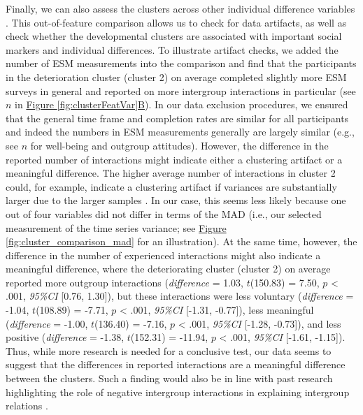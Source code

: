 \documentclass[man, 12pt, a4paper, floatsintext]{apa7}
\theoremstyle{break}
\theoremstyle{plain}
\newcommand{\fgrref}[2][]{\hyperref[#2]{Figure \ref*{#2}#1}}
\begin{document}
Finally, we can also assess the clusters across other individual
difference variables \citep[e.g.,][]{monden2022}. This out-of-feature
comparison allows us to check for data artifacts, as well as check
whether the developmental clusters are associated with important social
markers and individual differences. To illustrate artifact checks, we
added the number of ESM measurements into the comparison and find that
the participants in the deterioration cluster (cluster 2) on average
completed slightly more ESM surveys in general and reported on more
intergroup interactions in particular (see \(n\) in
\fgrref[B]{fig:clusterFeatVar}). In our data exclusion procedures, we
ensured that the general time frame and completion rates are similar for
all participants and indeed the numbers in ESM measurements generally
are largely similar (e.g., see \(n\) for well-being and outgroup
attitudes). However, the difference in the reported number of
interactions might indicate either a clustering artifact or a meaningful
difference. The higher average number of interactions in cluster 2
could, for example, indicate a clustering artifact if variances are
substantially larger due to the larger samples
\citep[e.g., restriction of range in the smaller sample][]{kogan2006}.
In our case, this seems less likely because one out of four variables
did not differ in terms of the MAD (i.e., our selected measurement of
the time series variance; see \fgrref{fig:cluster_comparison_mad} for an
illustration). At the same time, however, the difference in the number
of experienced interactions might also indicate a meaningful difference,
where the deteriorating cluster (cluster 2) on average reported more
outgroup interactions (\textit{difference} = 1.03, \(t\)(150.83) = 7.50,
\(p\) \textless{} .001, \textit{95\%CI} {[}0.76, 1.30{]}), but these
interactions were less voluntary (\textit{difference} = -1.04,
\(t\)(108.89) = -7.71, \(p\) \textless{} .001, \textit{95\%CI} {[}-1.31,
-0.77{]}), less meaningful (\textit{difference} = -1.00, \(t\)(136.40) =
-7.16, \(p\) \textless{} .001, \textit{95\%CI} {[}-1.28, -0.73{]}), and
less positive (\textit{difference} = -1.38, \(t\)(152.31) = -11.94,
\(p\) \textless{} .001, \textit{95\%CI} {[}-1.61, -1.15{]}). Thus, while
more research is needed for a conclusive test, our data seems to suggest
that the differences in reported interactions are a meaningful
difference between the clusters. Such a finding would also be in line
with past research highlighting the role of negative intergroup
interactions in explaining intergroup relations
\citep[e.g.,][]{Barlow2012, Prati2021, Graf2014}.
\end{document}
